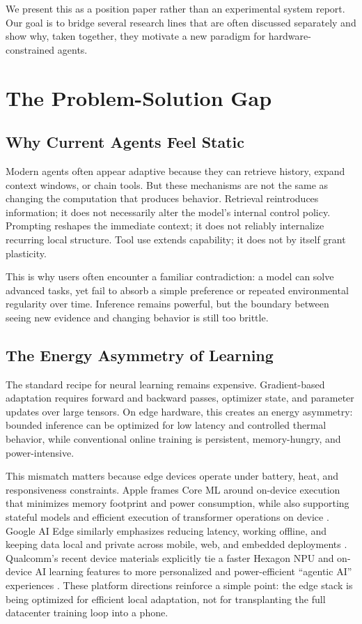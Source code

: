 \documentclass[11pt,a4paper]{article}
\begin{document}
We present this as a position paper rather than an experimental system report. Our goal is to bridge several research lines that are often discussed separately and show why, taken together, they motivate a new paradigm for hardware-constrained agents.

\section{The Problem-Solution Gap}

\subsection{Why Current Agents Feel Static}

Modern agents often appear adaptive because they can retrieve history, expand context windows, or chain tools. But these mechanisms are not the same as changing the computation that produces behavior. Retrieval reintroduces information; it does not necessarily alter the model's internal control policy. Prompting reshapes the immediate context; it does not reliably internalize recurring local structure. Tool use extends capability; it does not by itself grant plasticity.

This is why users often encounter a familiar contradiction: a model can solve advanced tasks, yet fail to absorb a simple preference or repeated environmental regularity over time. Inference remains powerful, but the boundary between seeing new evidence and changing behavior is still too brittle.

\subsection{The Energy Asymmetry of Learning}

The standard recipe for neural learning remains expensive. Gradient-based adaptation requires forward and backward passes, optimizer state, and parameter updates over large tensors. On edge hardware, this creates an energy asymmetry: bounded inference can be optimized for low latency and controlled thermal behavior, while conventional online training is persistent, memory-hungry, and power-intensive.

This mismatch matters because edge devices operate under battery, heat, and responsiveness constraints. Apple frames Core ML around on-device execution that minimizes memory footprint and power consumption, while also supporting stateful models and efficient execution of transformer operations on device \cite{apple_coreml}. Google AI Edge similarly emphasizes reducing latency, working offline, and keeping data local and private across mobile, web, and embedded deployments \cite{google_edge}. Qualcomm's recent device materials explicitly tie a faster Hexagon NPU and on-device AI learning features to more personalized and power-efficient ``agentic AI'' experiences \cite{qualcomm_2025}. These platform directions reinforce a simple point: the edge stack is being optimized for efficient local adaptation, not for transplanting the full datacenter training loop into a phone.
\end{document}
